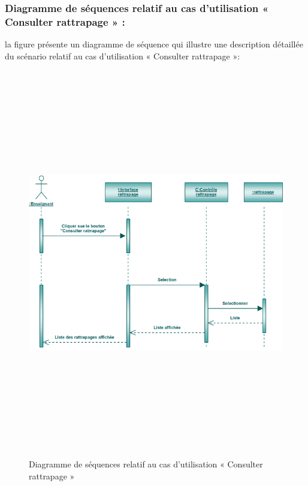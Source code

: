 \documentclass[12 pt]{report}
\begin{document}
\subsubsection{Diagramme de séquences relatif au cas d’utilisation « Consulter rattrapage » :}
la figure   présente un diagramme de séquence qui illustre une description détaillée du scénario relatif au cas d’utilisation « Consulter rattrapage »: 
{\begin{figure}[h]
 \begin{center}
\includegraphics[width= 18 cm ,height=  17cm]{sec_cons_rat.PNG}
\caption{Diagramme de séquences relatif au cas d’utilisation « Consulter rattrapage  »}

\end{center}
\end{figure}}


\newpage
\end{document}
